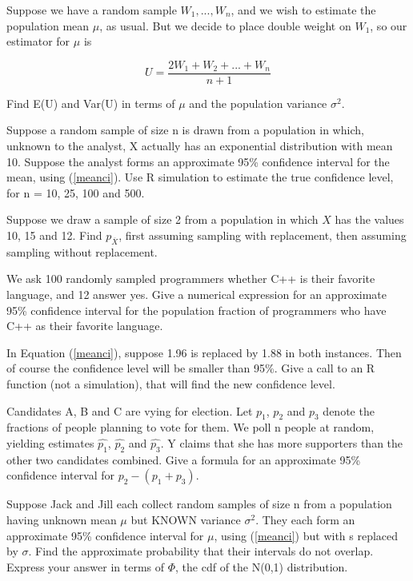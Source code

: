 \oneproblem
Suppose we have a random sample $W_1,...,W_n$, and we wish
to estimate the population mean $\mu$, as usual.  But we decide to place
double weight on $W_1$, so our estimator for $\mu$ is

\begin{equation}
U = \frac{2W_1+W_2+...+W_n}{n+1}
\end{equation}

Find E(U) and Var(U) in terms of $\mu$ and the population variance
$\sigma^2$.  

\oneproblem
Suppose a random sample of size n is drawn from a population in which,
unknown to the analyst, X actually has an exponential distribution
with mean 10. Suppose the analyst forms an approximate 95\% confidence
interval for the mean, using (\ref{meanci}). Use R simulation 
to estimate the true confidence level, for n = 10, 25, 100 and 500.

\oneproblem 
Suppose we draw a sample of size 2 from a population in which $X$ has
the values 10, 15 and 12.  Find $p_{\overline{X}}$, first assuming sampling
with replacement, then assuming sampling without replacement.

\oneproblem
We ask 100 randomly sampled programmers whether C++ is their
favorite language, and 12 answer yes.  Give a numerical expression for
an approximate 95\% confidence interval for the population fraction of
programmers who have C++ as their favorite language.

\oneproblem
In Equation (\ref{meanci}), suppose 1.96 is replaced by 1.88 in
both instances.  Then of course the confidence level will be smaller
than 95\%.  Give a call to an R function (not a simulation), that will
find the new confidence level.

\oneproblem
Candidates A, B and C are vying for election.  Let $p_1$, $p_2$ and 
$p_3$ denote the fractions of people planning to vote for them.  We 
poll n people at random, yielding estimates $\widehat{p_1}$, 
$\widehat{p_2}$ and $\widehat{p_3}$.  Y claims that she has more 
supporters than the other two candidates combined.  Give a formula 
for an approximate 95\% confidence interval for $p_2 - (p_1+p_3)$.

\oneproblem
Suppose Jack and Jill each collect random samples of size n from a 
population having unknown mean $\mu$ but KNOWN variance $\sigma^2$.  
They each form an approximate 95\% confidence interval for $\mu$, 
using (\ref{meanci}) but with s replaced by $\sigma$.  Find the 
approximate probability that their intervals do not overlap.  Express 
your answer in terms of $\Phi$, the cdf of the N(0,1) distribution. 


